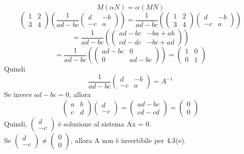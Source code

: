 \documentclass[12pt]{article}
\begin{document}
\[M(\alpha N ) = \alpha(MN)\]
\[\begin{pmatrix}
    1 & 2\\
    3 & 4
\end{pmatrix}
\left(\frac{1}{ad - bc}
\begin{pmatrix}
    d & -b\\
    -c & a
\end{pmatrix}\right) =
\frac{1}{ad - bc}\left(
\begin{pmatrix}
    1 & 2\\
    3 & 4
\end{pmatrix}
\begin{pmatrix}
    d & -b\\
    -c & a
\end{pmatrix}\right)\]
\[
= \frac{1}{ad - bc}\left(
\begin{pmatrix}
    ad-bc & -ba + ab\\
    cd - dc & -bc+ad
\end{pmatrix}\right)
\]
\[
= \frac{1}{ad - bc}\left(
\begin{pmatrix}
    ad-bc & 0\\
    0 & ad-bc
\end{pmatrix}\right)
= \begin{pmatrix}
    1 & 0\\
    0 & 1
\end{pmatrix}\]
Quindi \[\frac{1}{ad - bc}
\begin{pmatrix}
    d & -b\\
    -c & a
\end{pmatrix} = A^{-1}\]
Se invece $ad-bc = 0$, allora
\[
\begin{pmatrix}
    a & b\\
    c & d
\end{pmatrix}
\begin{pmatrix}
    d\\
    -c
\end{pmatrix}
=
\begin{pmatrix}
    ad-bc\\
    cd-cd
\end{pmatrix} =
\begin{pmatrix}
    0\\
    0
\end{pmatrix}
\]
Quindi, $\begin{pmatrix}
    d\\
    -c
\end{pmatrix}$ è soluzione al sistema Ax = 0.\\
Se $\begin{pmatrix}
    d\\
    -c
\end{pmatrix} \neq \begin{pmatrix}
    0\\
    0
\end{pmatrix}$, allora A non è invertibile per 4.3(e).
\end{document}
